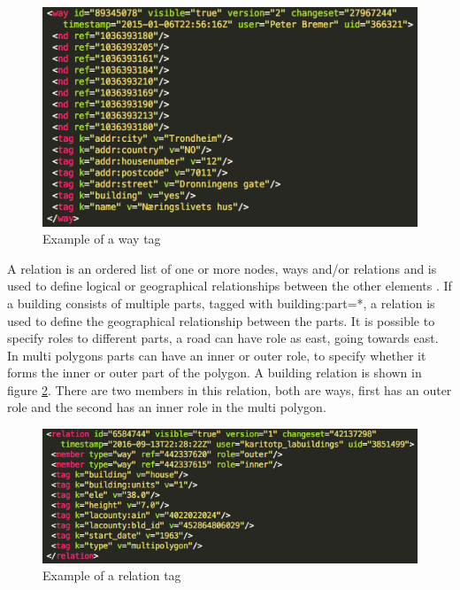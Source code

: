 \begin{figure}[H]
    \centering
    \includegraphics[scale=0.7]{figures/FixedByMe/way_tag.png}
    \caption{Example of a way tag}
    \label{fig:waytag}
\end{figure} 

A relation is an ordered list of one or more nodes, ways and/or relations and is used to define logical or geographical relationships between the other elements  \cite{OpenStreetMape}. If a building consists of multiple parts, tagged with building:part=*, a relation is used to define the geographical relationship between the parts. It is possible to specify roles to different parts, a road can have role as east, going towards east. In multi polygons parts can have an inner or outer role, to specify whether it forms the inner or outer part of the polygon. A building relation is shown in figure \ref{fig:reltag}. There are two members in this relation, both are ways, first has an outer role and the second has an inner role in the multi polygon.  

\begin{figure}[H]
    \centering
    \includegraphics[scale=0.7]{figures/FixedByMe/relation_tag.png}
    \caption{Example of a relation tag}
    \label{fig:reltag}
\end{figure} 

